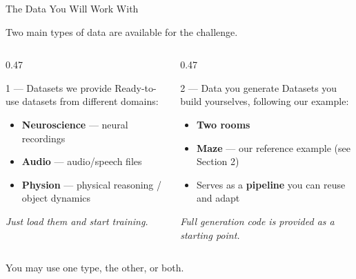 \documentclass[aspectratio=169]{beamer}
\begin{document}
\begin{frame}{The Data You Will Work With}
  \begin{center}
    \small Two main types of data are available for the challenge.
  \end{center}
  \vspace{0.3cm}

  \begin{columns}[T]
    \begin{column}{0.47\textwidth}
      \begin{block}{1 — Datasets we provide}
        Ready-to-use datasets from different domains:
        \begin{itemize}
          \item \textbf{Neuroscience} — neural recordings
          \item \textbf{Audio} — audio/speech files
          \item \textbf{Physion} — physical reasoning / object dynamics
        \end{itemize}
        \vspace{0.1cm}
        \footnotesize\itshape Just load them and start training.
      \end{block}
    \end{column}

    \begin{column}{0.47\textwidth}
      \begin{block}{2 — Data you generate}
        Datasets you build yourselves, following our example:
        \begin{itemize}
        \item \textbf{Two rooms}
          \item \textbf{Maze} — our reference example (see Section 2)
          \item Serves as a \textbf{pipeline} you can reuse and adapt
        \end{itemize}
        \vspace{0.1cm}
        \footnotesize\itshape Full generation code is provided as a starting point.
      \end{block}
    \end{column}
  \end{columns}

  \vspace{0.3cm}
  \begin{center}
    \small You may use one type, the other, or both.
  \end{center}
\end{frame}
\end{document}
